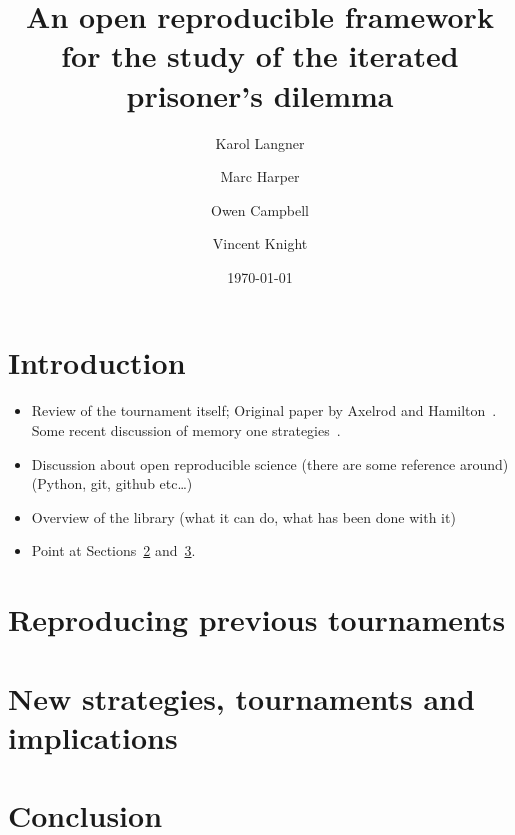 \documentclass{article}
\title{An open reproducible framework for the study of the iterated prisoner's
dilemma}
\author{Karol Langner\\
        \and
        Marc Harper\\
        \and
        Owen Campbell\\
        \and
        Vincent Knight\\
}
\date{\today}
\begin{document}
\maketitle

\section{Introduction}\label{sec:introduction}

\begin{itemize}
\item Review of the tournament itself;
      Original paper by Axelrod and Hamilton~\cite{1981-Axelrod-Hamilton}.
      Some recent discussion of memory one strategies~\cite{press2012iterated, stewart2012extortion}.

\item Discussion about open reproducible science (there are some reference
      around) (Python, git, github etc\dots)
\item Overview of the library (what it can do, what has been done with it)
\item Point at Sections~\ref{sec:reproducing-previous-tournaments}
      and~\ref{sec:new-strategies-and-implications}.
\end{itemize}

\section{Reproducing previous tournaments}\label{sec:reproducing-previous-tournaments}

\section{New strategies, tournaments and implications}\label{sec:new-strategies-and-implications}

\section{Conclusion}\label{sec:conclusion}

\printbibliography
\end{document}
